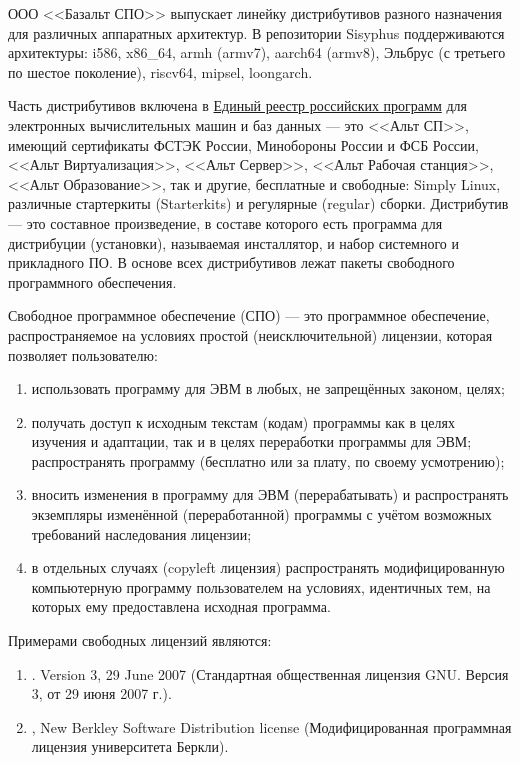 ООО <<Базальт СПО>> выпускает линейку дистрибутивов разного назначения для различных аппаратных архитектур.
В репозитории Sisyphus поддерживаются архитектуры: i586, x86\_64, armh (armv7), aarch64 (armv8), 
Эльбрус (с третьего по шестое поколение), riscv64, mipsel, loongarch.

Часть дистрибутивов включена в \href{reestr.digital.gov.ru}{Единый реестр российских программ} для электронных 
вычислительных машин и баз данных --- это <<Альт СП>>, имеющий сертификаты ФСТЭК России, 
Минобороны России и ФСБ России, <<Альт Виртуализация>>, <<Альт Сервер>>, <<Альт Рабочая станция>>, 
<<Альт Образование>>, так и другие, бесплатные и свободные: Simply Linux, различные стартеркиты 
(Starterkits) и регулярные (regular) сборки. Дистрибутив --- это составное произведение, 
в составе которого есть программа для дистрибуции (установки), называемая инсталлятор, и 
набор системного и прикладного ПО. В основе всех дистрибутивов лежат пакеты свободного 
программного обеспечения.

Свободное программное обеспечение (СПО) --- это программное обеспечение, распространяемое 
на условиях простой (неисключительной) лицензии, которая позволяет пользователю:
\begin{enumerate}
    \item использовать программу для ЭВМ в любых, не запрещённых законом, целях;
    \item получать доступ к исходным текстам (кодам) программы как в целях изучения и адаптации, 
    так и в целях переработки программы для ЭВМ; распространять программу (бесплатно или за плату, по своему усмотрению);
    \item вносить изменения в программу для ЭВМ (перерабатывать) и распространять экземпляры изменённой (переработанной) 
    программы с учётом возможных требований наследования лицензии;
    \item в отдельных случаях (copyleft лицензия) распространять модифицированную компьютерную программу пользователем 
    на условиях, идентичных тем, на которых ему предоставлена исходная программа.
\end{enumerate}

Примерами свободных лицензий являются:
\begin{enumerate}
    \item \href{https://www.gnu.org/licenses/gpl-3.0.html}{}. Version 3, 29 June 2007 (Стандартная общественная лицензия GNU. Версия 3, от 29 июня 2007 г.).
    \item \href{https://en.wikipedia.org/wiki/BSD_licenses}{}, New Berkley Software Distribution license (Модифицированная программная лицензия университета Беркли).
\end{enumerate}

